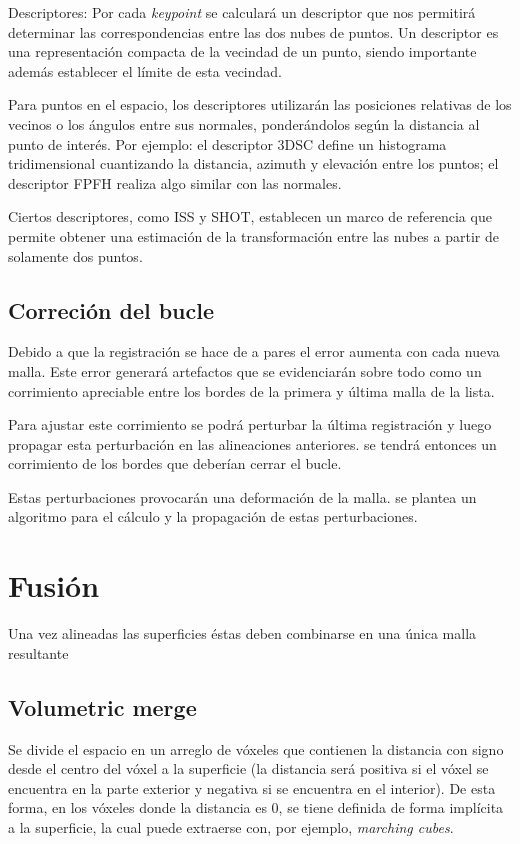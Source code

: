 \documentclass{pfc}
\begin{document}
		Descriptores:
			Por cada \emph{keypoint} se calculará un descriptor que nos
			permitirá determinar las correspondencias entre las dos nubes de
			puntos.
			Un descriptor es una representación compacta
			de la vecindad de un punto,
			siendo importante además establecer el límite de esta vecindad.

			Para puntos en el espacio, los descriptores utilizarán las
			posiciones relativas de los vecinos o los ángulos entre sus
			normales, ponderándolos según la distancia al punto de interés.
			Por ejemplo: el descriptor 3DSC define un histograma tridimensional
			cuantizando la distancia, azimuth y elevación entre los puntos;
			el descriptor FPFH realiza algo similar con las normales.

			Ciertos descriptores, como ISS y SHOT, establecen un marco de
			referencia que permite obtener una estimación de la transformación
			entre las nubes a partir de solamente dos puntos.

		\subsection{Correción del bucle}
			Debido a que la registración se hace de a pares el error aumenta
			con cada nueva malla.
			Este error generará artefactos que se evidenciarán sobre todo como
			un corrimiento apreciable entre los bordes de la primera y última
			malla de la lista.

			Para ajustar este corrimiento se podrá perturbar la última
			registración y luego propagar esta perturbación en las alineaciones
			anteriores.
			se tendrá entonces un corrimiento de los
			bordes que deberían cerrar el bucle.

			Estas perturbaciones provocarán una deformación de la malla.
			se plantea un algoritmo para el cálculo
			y la propagación de estas perturbaciones.

	\section{Fusión}
		Una vez alineadas las superficies éstas deben combinarse en una única malla resultante

		\subsection{Volumetric merge}
		Se divide el espacio en un arreglo de vóxeles que contienen la
		distancia con signo desde el centro del vóxel a la superficie (la
		distancia será positiva si el vóxel se encuentra en la parte exterior y
		negativa si se encuentra en el interior). De esta forma, en los vóxeles
		donde la distancia es 0, se tiene definida de forma implícita a la
		superficie, la cual puede extraerse con, por ejemplo, \emph{marching cubes}.
\end{document}
